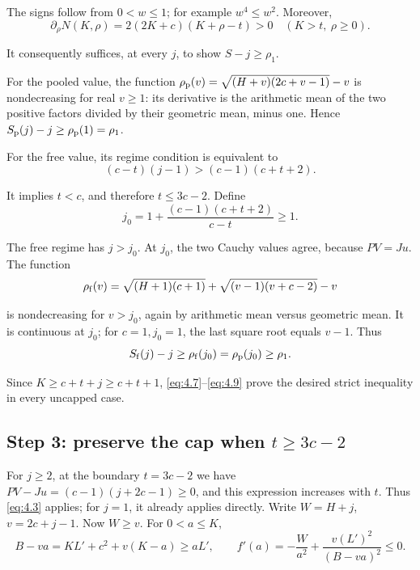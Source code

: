 \documentclass[11pt,a4paper]{article}
\begin{document}
The signs follow from \(0<w\le1\); for example \(w^4\le w^2\). Moreover,
\begin{equation}
\partial_\rho N(K,\rho)=2(2K+c)(K+\rho-t)>0
\quad(K>t,\ \rho\ge0).
\tag{4.9}
\label{eq:4.9}
\end{equation}

It consequently suffices, at every \(j\), to show \(S-j\ge\rho_1\).

For the pooled value, the function \(\rho_{\rm p}(v)=\sqrt{(H+v)(2c+v-1)}-v\) is nondecreasing for real \(v\ge1\): its derivative is the arithmetic mean of the two positive factors divided by their geometric mean, minus one. Hence \(S_{\rm p}(j)-j\ge\rho_{\rm p}(1)=\rho_1\).

For the free value, its regime condition is equivalent to
\[
(c-t)(j-1)>(c-1)(c+t+2).
\]

It implies \(t<c\), and therefore \(t\le3c-2\). Define
\begin{equation}
j_0=1+\frac{(c-1)(c+t+2)}{c-t}\ge1.
\tag{4.10}
\label{eq:4.10}
\end{equation}

The free regime has \(j>j_0\). At \(j_0\), the two Cauchy values agree, because \(PV=Ju\). The function
\[
\rho_{\rm f}(v)
=\sqrt{(H+1)(c+1)}+\sqrt{(v-1)(v+c-2)}-v
\]

is nondecreasing for \(v>j_0\), again by arithmetic mean versus geometric mean. It is continuous at \(j_0\); for \(c=1,j_0=1\), the last square root equals \(v-1\). Thus
\[
S_{\rm f}(j)-j\ge\rho_{\rm f}(j_0)
=\rho_{\rm p}(j_0)\ge\rho_1.
\]

Since \(K\ge c+t+j\ge c+t+1\), \eqref{eq:4.7}--\eqref{eq:4.9} prove the desired strict inequality in every uncapped case.

\hypertarget{step-3-preserve-the-cap-when-tge3c-2}{%
\subsection*{\texorpdfstring{Step 3: preserve the cap when \(t\ge3c-2\)}{Step 3: preserve the cap when t\textbackslash ge3c-2}}\label{step-3-preserve-the-cap-when-tge3c-2}}

For \(j\ge2\), at the boundary \(t=3c-2\) we have \(PV-Ju=(c-1)(j+2c-1)\ge0\), and this expression increases with \(t\). Thus \eqref{eq:4.3} applies; for \(j=1\), it already applies directly. Write \(W=H+j\), \(v=2c+j-1\). Now \(W\ge v\). For \(0<a\le K\),
\[
B-va=KL'+c^2+v(K-a)\ge aL',
\qquad
f'(a)=-\frac W{a^2}
       +\frac{v(L')^2}{(B-va)^2}\le0.
\]
\end{document}
